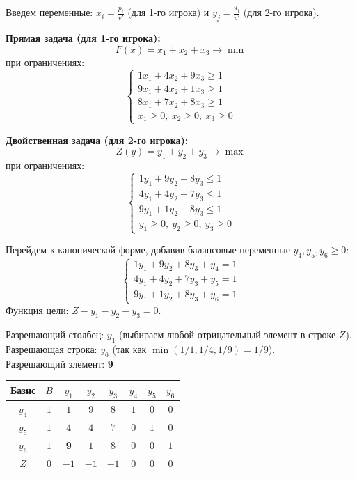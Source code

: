 \documentclass[a4paper,12pt]{article}
\begin{document}
Введем переменные: $x_i = \frac{p_i}{v'}$ (для 1-го игрока) и $y_j = \frac{q_j}{v'}$ (для 2-го игрока).

\textbf{Прямая задача (для 1-го игрока):}
$$ F(x) = x_1 + x_2 + x_3 \rightarrow \min $$
при ограничениях:
$$ \begin{cases} 
1x_1 + 4x_2 + 9x_3 \ge 1 \\ 
9x_1 + 4x_2 + 1x_3 \ge 1 \\ 
8x_1 + 7x_2 + 8x_3 \ge 1 \\
x_1 \ge 0, \ x_2 \ge 0, \ x_3 \ge 0
\end{cases} $$

\textbf{Двойственная задача (для 2-го игрока):}
$$ Z(y) = y_1 + y_2 + y_3 \rightarrow \max $$
при ограничениях:
$$ \begin{cases} 
1y_1 + 9y_2 + 8y_3 \le 1 \\ 
4y_1 + 4y_2 + 7y_3 \le 1 \\ 
9y_1 + 1y_2 + 8y_3 \le 1 \\
y_1 \ge 0, \ y_2 \ge 0, \ y_3 \ge 0
\end{cases} $$

Перейдем к канонической форме, добавив балансовые переменные $y_4, y_5, y_6 \ge 0$:
$$ \begin{cases} 
1y_1 + 9y_2 + 8y_3 + y_4 = 1 \\ 
4y_1 + 4y_2 + 7y_3 + y_5 = 1 \\ 
9y_1 + 1y_2 + 8y_3 + y_6 = 1 
\end{cases} $$
Функция цели: $Z - y_1 - y_2 - y_3 = 0$.

\vspace{0.5cm}
Разрешающий столбец: $y_1$ (выбираем любой отрицательный элемент в строке $Z$).\\
Разрешающая строка: $y_6$ (так как $\min(1/1, 1/4, 1/9) = 1/9$).\\
Разрешающий элемент: \textbf{9}

\begin{center}
\renewcommand{\arraystretch}{1.2}
\begin{tabular}{|c|c|c|c|c|c|c|c|}
\hline
Базис & $B$ & $y_1$ & $y_2$ & $y_3$ & $y_4$ & $y_5$ & $y_6$ \\ \hline
$y_4$ & $1$ & $1$ & $9$ & $8$ & $1$ & $0$ & $0$ \\ \hline
$y_5$ & $1$ & $4$ & $4$ & $7$ & $0$ & $1$ & $0$ \\ \hline
$y_6$ & $1$ & \textbf{9} & $1$ & $8$ & $0$ & $0$ & $1$ \\ \hline
$Z$   & $0$ & $-1$& $-1$& $-1$& $0$ & $0$ & $0$ \\ \hline
\end{tabular}
\end{center}
\end{document}
